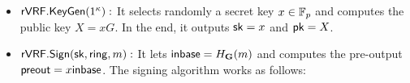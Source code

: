 \begin{itemize}
	\item $ {\mathsf{rVRF}}.{\mathsf{KeyGen}}(1^\kappa):  $ It selects randomly a secret key $ x \in \mathbb{F}_p$ and computes the public key $ X = xG $. In the end, it outputs $ \mathsf{sk} = x $ and $ \mathsf{pk} = X $.
	
	
	
	
	\item $ {\mathsf{rVRF}}.{\mathsf{Sign}}(\mathsf{sk}, \mathsf{ring}, m):$ It lets $ {\mathsf{inbase}} = H_{\mathbf{G}}(m) $ and computes the pre-output $ {\mathsf{preout}}= x{\mathsf{inbase}}$. The signing algorithm works as follows: 

	\begin{itemize}
		

\end{itemize}
\end{itemize}
